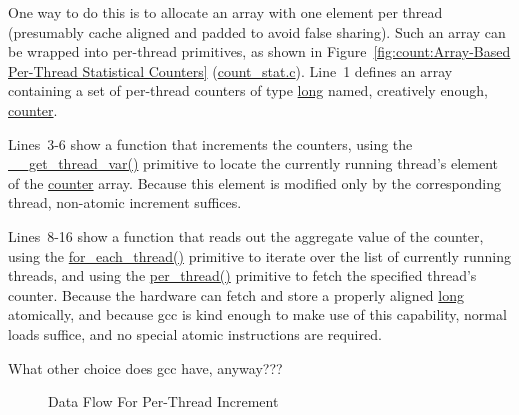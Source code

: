 One way to do this is to allocate an array with one element per
thread (presumably cache aligned and padded to avoid false sharing).
Such an array can be wrapped into per-thread primitives, as shown in
Figure~\ref{fig:count:Array-Based Per-Thread Statistical Counters}
(\url{count_stat.c}).
Line~1 defines an array containing a set of per-thread counters of
type \url{long} named, creatively enough, \url{counter}.

Lines~3-6 show a function that increments the counters, using the
\url{__get_thread_var()} primitive to locate the currently running
thread's element of the \url{counter} array.
Because this element is modified only by the corresponding thread,
non-atomic increment suffices.

Lines~8-16 show a function that reads out the aggregate value of the counter,
using the \url{for_each_thread()} primitive to iterate over the list of
currently running threads, and using the \url{per_thread()} primitive
to fetch the specified thread's counter.
Because the hardware can fetch and store a properly aligned \url{long}
atomically, and because gcc is kind enough to make use of this capability,
normal loads suffice, and no special atomic instructions are required.

\QuickQuiz{}
	What other choice does gcc have, anyway???
 \QuickQuizEnd

\begin{figure}[tb]
\begin{center}
\end{center}
\caption{Data Flow For Per-Thread Increment}
\label{fig:count:Data Flow For Per-Thread Increment}
\end{figure}

